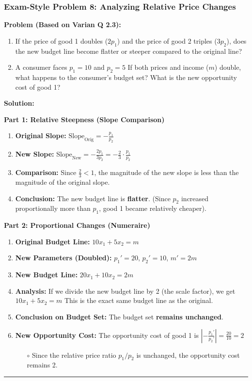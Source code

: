 \documentclass{article}
\begin{document}
\subsubsection*{Exam-Style Problem 8: Analyzing Relative Price Changes}

\textbf{Problem (Based on Varian Q 2.3):}
\begin{enumerate}
    \item If the price of good 1 doubles ($2p_1$) and the price of good 2 triples ($3p_2$), does the new budget line become flatter or steeper compared to the original line?
    \item A consumer faces $p_1=10$ and $p_2=5$ If both prices and income ($m$) double, what happens to the consumer's budget set? What is the new opportunity cost of good 1?
\end{enumerate}

\textbf{Solution:}

\textbf{Part 1: Relative Steepness (Slope Comparison)}
\begin{enumerate}
    \item \textbf{Original Slope:} $\text{Slope}_{\text{Orig}} = -\frac{p_1}{p_2}$
    \item \textbf{New Slope:} $\text{Slope}_{\text{New}} = -\frac{2p_1}{3p_2} = -\frac{2}{3} \cdot \frac{p_1}{p_2}$
    \item \textbf{Comparison:} Since $\frac{2}{3} < 1$, the magnitude of the new slope is less than the magnitude of the original slope.
    \item \textbf{Conclusion:} The new budget line is \textbf{flatter}. (Since $p_2$ increased proportionally more than $p_1$, good 1 became relatively cheaper).
\end{enumerate}

\textbf{Part 2: Proportional Changes (Numeraire)}
\begin{enumerate}
    \item \textbf{Original Budget Line:} $10x_1 + 5x_2 = m$
    \item \textbf{New Parameters (Doubled):} $p_1'=20$, $p_2'=10$, $m'=2m$
    \item \textbf{New Budget Line:} $20x_1 + 10x_2 = 2m$
    \item \textbf{Analysis:} If we divide the new budget line by 2 (the scale factor), we get $10x_1 + 5x_2 = m$ This is the exact same budget line as the original.
    \item \textbf{Conclusion on Budget Set:} The budget set \textbf{remains unchanged}.
    \item \textbf{New Opportunity Cost:} The opportunity cost of good 1 is $|-\frac{p_1'}{p_2'}| = \frac{20}{10} = 2$
    \begin{itemize}
        \item[$\circ$] Since the relative price ratio $p_1/p_2$ is unchanged, the opportunity cost remains 2.
    \end{itemize}
\end{enumerate}
\noindent\rule{\linewidth}{0.4pt}
\pagebreak
\end{document}
